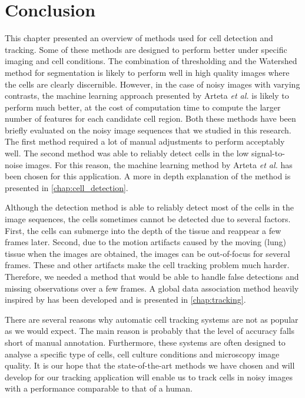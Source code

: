 \section{Conclusion}
\label{sec:conclusionmethods}
This chapter presented an overview of methods used for cell detection and tracking. Some of these methods are designed to perform better under specific imaging and cell conditions. The combination of thresholding and the Watershed method for segmentation is likely to perform well in high quality images where the cells are clearly discernible. However, in the case of noisy images with varying contrasts, the machine learning approach presented by Arteta \emph{et al.} is likely to perform much better, at the cost of computation time to compute the larger number of features for each candidate cell region. Both these methods have been briefly evaluated on the noisy image sequences that we studied in this research. The first method required a lot of manual adjustments to perform acceptably well. The second method was able to reliably detect cells in the low signal-to-noise images. For this reason, the machine learning method by Arteta \emph{et al.} has been chosen for this application. A more in depth explanation of the method is presented in \cref{chap:cell_detection}.

Although the detection method is able to reliably detect most of the cells in the image sequences, the cells sometimes cannot be detected due to several factors. First, the cells can submerge into the depth of the tissue and reappear a few frames later. Second, due to the motion artifacts caused by the moving (lung) tissue when the images are obtained, the images can be out-of-focus for several frames. These and other artifacts make the cell tracking problem much harder. Therefore, we needed a method that would be able to handle false detections and missing observations over a few frames. A global data association method heavily inspired by \cite{bise11global} has been developed and is presented in \cref{chap:tracking}.

There are several reasons why automatic cell tracking systems are not as popular as we would expect. The main reason is probably that the level of accuracy falls short of manual annotation. Furthermore, these systems are often designed to analyse a specific type of cells, cell culture conditions and microscopy image quality. It is our hope that the state-of-the-art methods we have chosen and will develop for our tracking application will enable us to track cells in noisy images with a performance comparable to that of a human.